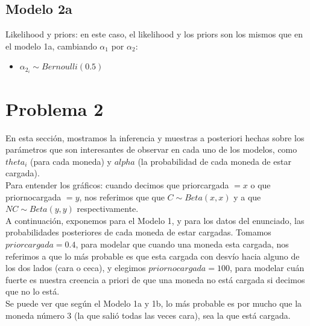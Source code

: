 \documentclass[a4paper]{article}
\begin{document}
\subsection{Modelo 2a}
\newline
Likelihood y priors: en este caso, el likelihood y los priors son los mismos que en el modelo 1a,
cambiando $\alpha_1$ 
por $\alpha_2$:
\begin{itemize}
	\item $ \alpha_{2_i} \sim Bernoulli(0.5) $
\end{itemize}

\section {Problema 2}
En esta sección, mostramos la inferencia y muestras a posteriori hechas sobre los 
parámetros que son interesantes de
observar en cada uno de los modelos, como $theta_i$ (para cada moneda) y $alpha$
(la probabilidad de cada moneda de estar cargada). \\
Para entender los gráficos: cuando decimos que priorcargada $= x$ o que 
priornocargada $= y$, nos referimos que que $C \sim Beta(x,x)$ y a que 
$NC \sim Beta(y,y)$ respectivamente. \\

A continuación, exponemos para el Modelo 1, y para los datos del enunciado,
las probabilidades posteriores de cada moneda de estar cargadas. Tomamos 
$priorcargada = 0.4$, para modelar que cuando una moneda esta cargada, nos 
referimos a que lo más probable es que esta cargada con desvío hacia alguno
de los dos lados (cara o ceca), y elegimos $priornocargada = 100$, para 
modelar cuán fuerte es nuestra creencia a priori de que una moneda no está cargada si
decimos que no lo está. \\

Se puede ver que según el Modelo 1a y 1b, lo más probable es por mucho que la moneda número
3 (la que salió todas las veces cara), sea la que está cargada. 
\end{document}
